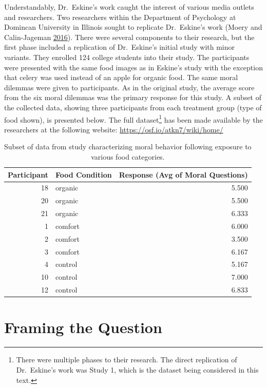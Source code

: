\documentclass[]{book}
\let\rmarkdownfootnote\footnote%
\def\footnote{\protect\rmarkdownfootnote}
\theoremstyle{definition}
\theoremstyle{definition}
\theoremstyle{definition}
\theoremstyle{remark}
\begin{document}
Understandably, Dr.~Eskine's work caught the interest of various media
outlets and researchers. Two researchers within the Department of
Psychology at Domincan University in Illinois sought to replicate
Dr.~Eskine's work (Moery and Calin-Jageman
\protect\hyperlink{ref-Moery2016}{2016}). There were several components
to their research, but the first phase included a replication of
Dr.~Eskine's initial study with minor variants. They enrolled 124
college students into their study. The participants were presented with
the same food images as in Eskine's study with the exception that celery
was used instead of an apple for organic food. The same moral dilemmas
were given to participants. As in the original study, the average score
from the six moral dilemmas was the primary response for this study. A
subset of the collected data, showing three participants from each
treatment group (type of food shown), is presented below. The full
dataset\footnote{There were multiple phases to their research. The
  direct replication of Dr.~Eskine's work was Study 1, which is the
  dataset being considered in this text.} has been made available by the
researchers at the following website:
\url{https://osf.io/atkn7/wiki/home/}

\begin{table}

\caption{\label{tab:caseorganic-table}Subset of data from study characterizing moral behavior following exposure to various food categories.}
\centering
\begin{tabular}[t]{r|l|r}
\hline
Participant & Food Condition & Response (Avg of Moral Questions)\\
\hline
18 & organic & 5.500\\
\hline
20 & organic & 5.500\\
\hline
21 & organic & 6.333\\
\hline
1 & comfort & 6.000\\
\hline
2 & comfort & 3.500\\
\hline
3 & comfort & 6.167\\
\hline
4 & control & 5.167\\
\hline
10 & control & 7.000\\
\hline
12 & control & 6.833\\
\hline
\end{tabular}
\end{table}

\chapter{Framing the Question}\label{ANOVAquestions}
\end{document}
